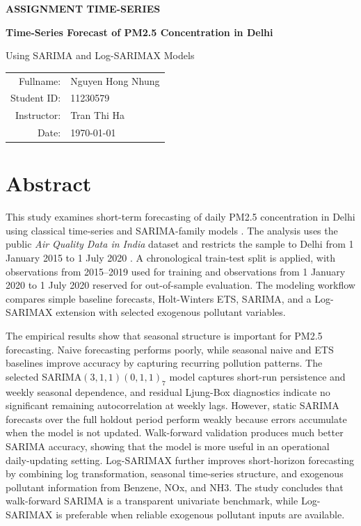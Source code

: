 \documentclass[11pt]{article}
\begin{document}
\sloppy
{}
\thispagestyle{empty}
\begin{center}
\vspace*{1.35in}
{\fontsize{24}{18}\selectfont\bfseries ASSIGNMENT TIME-SERIES}\par
\vspace{1in}
{\fontsize{30}{38}\selectfont\bfseries Time-Series Forecast of PM2.5 Concentration in Delhi}\par
\vspace{0.35in}
{\LARGE Using SARIMA and Log-SARIMAX Models}\par
\vspace{2in}
\begin{tabular}{rl}
Fullname: & Nguyen Hong Nhung \\
Student ID: & 11230579 \\
Instructor: & Tran Thi Ha \\
Date: & \today
\end{tabular}
\vfill
\end{center}
\newpage

\thispagestyle{empty}
\section*{Abstract}
This study examines short-term forecasting of daily PM2.5 concentration in Delhi using classical time-series and SARIMA-family models \cite{khan2024,wu2025}. The analysis uses the public \textit{Air Quality Data in India} dataset and restricts the sample to Delhi from 1 January 2015 to 1 July 2020 \cite{rao2020}. A chronological train-test split is applied, with observations from 2015--2019 used for training and observations from 1 January 2020 to 1 July 2020 reserved for out-of-sample evaluation. The modeling workflow compares simple baseline forecasts, Holt-Winters ETS, SARIMA, and a Log-SARIMAX extension with selected exogenous pollutant variables.

The empirical results show that seasonal structure is important for PM2.5 forecasting. Naive forecasting performs poorly, while seasonal naive and ETS baselines improve accuracy by capturing recurring pollution patterns. The selected SARIMA$(3,1,1)(0,1,1)_7$ model captures short-run persistence and weekly seasonal dependence, and residual Ljung-Box diagnostics indicate no significant remaining autocorrelation at weekly lags. However, static SARIMA forecasts over the full holdout period perform weakly because errors accumulate when the model is not updated. Walk-forward validation produces much better SARIMA accuracy, showing that the model is more useful in an operational daily-updating setting. Log-SARIMAX further improves short-horizon forecasting by combining log transformation, seasonal time-series structure, and exogenous pollutant information from Benzene, NOx, and NH3. The study concludes that walk-forward SARIMA is a transparent univariate benchmark, while Log-SARIMAX is preferable when reliable exogenous pollutant inputs are available.
\end{document}
